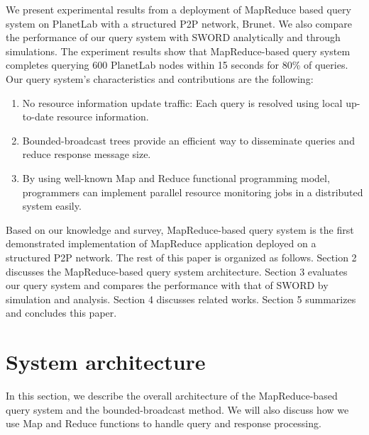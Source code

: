 \documentclass{acm_proc_article-sp}
\begin{document}
We present experimental results from a deployment of MapReduce based query system on PlanetLab\cite{planetlab} with a structured P2P network, Brunet\cite{brunet}. 
We also compare the performance of our query system with SWORD\cite{sword} analytically and through simulations.
The experiment results show that MapReduce-based query system completes querying 600 PlanetLab nodes within 15 seconds for 80\% of queries.
Our query system's characteristics and contributions are the following:
\begin{enumerate}
\setlength{\itemsep}{0pt}
\setlength{\parskip}{0pt}
\item No resource information update traffic: Each query is resolved using local up-to-date resource information.
\item Bounded-broadcast trees provide an efficient way to disseminate queries and reduce response message size.
\item By using well-known Map and Reduce functional programming model, programmers can implement parallel resource monitoring jobs in a distributed system easily.
\end{enumerate}
Based on our knowledge and survey, MapReduce-based query system is the first demonstrated implementation of MapReduce application deployed on a structured P2P network.
The rest of this paper is organized as follows. 
Section 2 discusses the MapReduce-based query system architecture. 
Section 3 evaluates our query system and compares the performance with that of SWORD by simulation and analysis. Section 4 discusses related works.
Section 5 summarizes and concludes this paper.

\section{System architecture}
In this section, we describe the overall architecture of the MapReduce-based query system and the bounded-broadcast method. 
We will also discuss how we use Map and Reduce functions to handle query and response processing.
\end{document}
